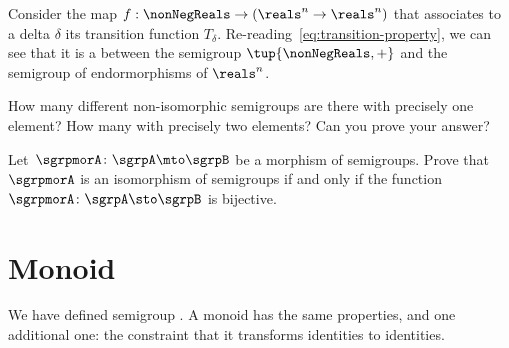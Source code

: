 \begin{example}
  Consider the map $f: \nonNegReals \to (\reals^n \to \reals^n)$ that associates to a delta $\delta$
  its transition function $T_\delta$.
  Re-reading~\cref{eq:transition-property}, we can see that it is a \whomo between the semigroup $\tup{\nonNegReals,+}$ and the semigroup of endormorphisms of $\reals^n$.
\end{example}




\begin{gradedexercise}
  \label{ex:non-isomorphic}
  How many different non-isomorphic semigroups are there with precisely one element?
  How many with precisely two elements? Can you prove your answer?
\end{gradedexercise}
\begin{solution}
\end{solution}

\begin{exercise}
  \label{ex:semi-morph}
  Let~$\sgrpmorA\colon \sgrpA \mto \sgrpB$ be a morphism of semigroups.
  Prove that~$\sgrpmorA$ is an isomorphism of semigroups if and only if the function~$\sgrpmorA\colon \sgrpA \sto \sgrpB$ is bijective.
\end{exercise}
\begin{solution}
\end{solution}


\section{Monoid \whomos}

We have defined semigroup \whomo. A monoid \whomo has the same properties, and one additional one: the constraint that it transforms identities to identities.

